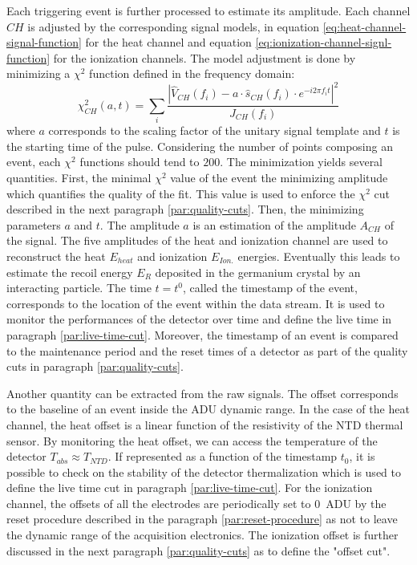 Each triggering event is further processed to estimate its amplitude. Each channel $CH$ is adjusted by the corresponding signal models, in equation \ref{eq:heat-channel-signal-function} for the heat channel and equation \ref{eq:ionization-channel-signl-function} for the ionization channels. The model adjustment is done by minimizing a $\chi^2$ function defined in the frequency domain:
\begin{equation}
\chi_{CH}^2(a, t) =
\sum_i 
\frac{
|\hat{V}_{CH}(f_i) - a \cdot \hat{s}_{CH}(f_i) \cdot e^{-i 2 \pi f_i t}|^2
}{
J_{CH}(f_i)
}
\end{equation}
where $a$ corresponds to the scaling factor of the unitary signal template and $t$ is the starting time of the pulse. Considering the number of points composing an event, each $\chi^2$ functions should tend to $200$. The minimization yields several quantities. First, the minimal $\chi^2$ value of the event the minimizing amplitude which quantifies the quality of the fit. This value is used to enforce the $\chi^2$ cut described in the next paragraph \ref{par:quality-cuts}. Then, the minimizing parameters $a$ and $t$. The amplitude $a$ is an estimation of the amplitude $A_{CH}$ of the signal. The five amplitudes of the heat and ionization channel are used to reconstruct the heat $E_{heat}$ and ionization $E_{Ion.}$ energies. Eventually this leads to estimate the recoil energy $E_R$ deposited in the germanium crystal by an interacting particle. The time $t=t^0$, called the timestamp of the event, corresponds to the location of the event within the data stream. It is used to monitor the performances of the detector over time and define the live time in paragraph \ref{par:live-time-cut}. Moreover, the timestamp of an event is compared to the maintenance period and the reset times of a detector as part of the quality cuts in paragraph \ref{par:quality-cuts}.


Another quantity can be extracted from the raw signals. The offset corresponds to the baseline of an event inside the ADU dynamic range. In the case of the heat channel, the heat offset is a linear function of the resistivity of the NTD thermal sensor. By monitoring the heat offset, we can access the temperature of the detector $T_{abs} \approx T_{NTD}$. If represented as a function of the timestamp $t_0$, it is possible to check on the stability of the detector thermalization which is used to define the live time cut in paragraph \ref{par:live-time-cut}.
For the ionization channel, the offsets of all the electrodes are periodically set to \SI{0}{\textsf{ADU}} by the reset procedure described in the paragraph \ref{par:reset-procedure} as not to leave the dynamic range of the acquisition electronics. The ionization offset is further discussed in the next paragraph \ref{par:quality-cuts} as to define the "offset cut".

